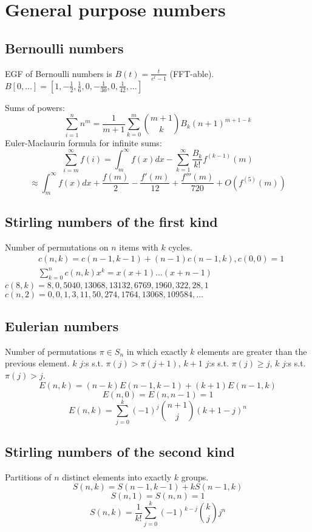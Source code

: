 
\section{General purpose numbers}

\subsection{Bernoulli numbers}
	EGF of Bernoulli numbers is $B(t)=\frac{t}{e^t-1}$ (FFT-able).
	$B[0,\ldots] = [1, -\frac{1}{2}, \frac{1}{6}, 0, -\frac{1}{30}, 0, \frac{1}{42}, \ldots]$

	Sums of powers:
	\small
	\[ \sum_{i=1}^n n^m = \frac{1}{m+1} \sum_{k=0}^m \binom{m+1}{k} B_k (n+1)^{m+1-k} \]
	\normalsize
	Euler-Maclaurin formula for infinite sums:
	\small
	\[ \sum_{i=m}^{\infty} f(i) = \int_m^\infty f(x) dx - \sum_{k=1}^\infty \frac{B_k}{k!}f^{(k-1)}(m) \]
	\[ \approx \int_{m}^\infty f(x)dx + \frac{f(m)}{2} - \frac{f'(m)}{12} + \frac{f'''(m)}{720} + O(f^{(5)}(m)) \]
	\normalsize

\subsection{Stirling numbers of the first kind}
	Number of permutations on $n$ items with $k$ cycles.
	\begin{align*}
		&c(n,k) = c(n-1,k-1) + (n-1) c(n-1,k), c(0,0) = 1\\
		&\textstyle \sum_{k=0}^n c(n,k)x^k = x(x+1) \dots (x+n-1)
	\end{align*}
	$c(8,k) = 8, 0, 5040, 13068, 13132, 6769, 1960, 322, 28, 1$ 
	$c(n,2) = 0, 0, 1, 3, 11, 50, 274, 1764, 13068, 109584, \dots$

\subsection{Eulerian numbers}
	Number of permutations $\pi \in S_n$ in which exactly $k$ elements are greater than the previous element. $k$ $j$:s s.t. $\pi(j)>\pi(j+1)$, $k+1$ $j$:s s.t. $\pi(j)\geq j$, $k$ $j$:s s.t. $\pi(j)>j$.
	$$E(n,k) = (n-k)E(n-1,k-1) + (k+1)E(n-1,k)$$
	$$E(n,0) = E(n,n-1) = 1$$
	$$E(n,k) = \sum_{j=0}^k(-1)^j\binom{n+1}{j}(k+1-j)^n$$

\subsection{Stirling numbers of the second kind}
	Partitions of $n$ distinct elements into exactly $k$ groups.
	$$S(n,k) = S(n-1,k-1) + k S(n-1,k)$$
	$$S(n,1) = S(n,n) = 1$$
	$$S(n,k) = \frac{1}{k!}\sum_{j=0}^k (-1)^{k-j}\binom{k}{j}j^n$$

